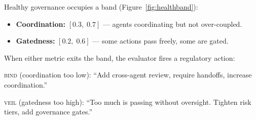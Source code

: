\documentclass[sigconf,nonacm]{acmart}
\begin{document}
Healthy governance occupies a band (Figure~\ref{fig:healthband}):

\begin{itemize}[leftmargin=*]
  \item \textbf{Coordination:} $[0.3,\; 0.7]$ --- agents coordinating
    but not over-coupled.
  \item \textbf{Gatedness:} $[0.2,\; 0.6]$ --- some actions pass freely,
    some are gated.
\end{itemize}

When either metric exits the band, the evaluator fires a regulatory
action:

\textsc{bind} (coordination too low): ``Add cross-agent review, require
handoffs, increase coordination.''

\textsc{veil} (gatedness too high): ``Too much is passing without
oversight. Tighten risk tiers, add governance gates.''
\end{document}
